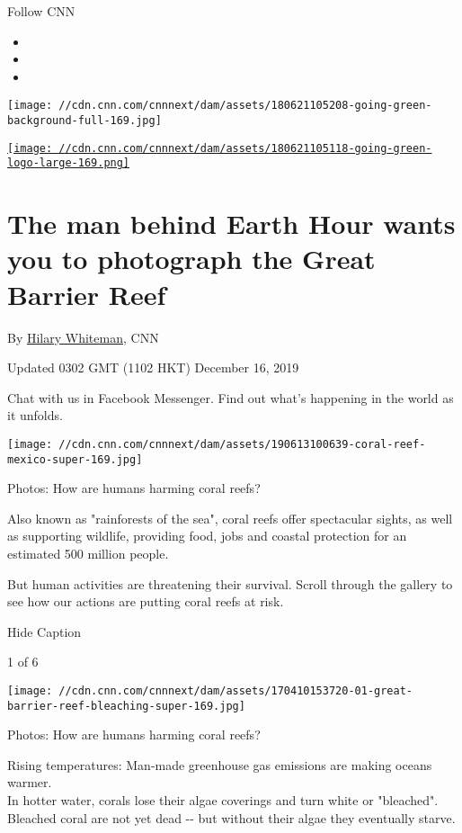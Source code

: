 Follow CNN

\begin{itemize}
\item
\item
\item
\end{itemize}

\texttt{[image: //cdn.cnn.com/cnnnext/dam/assets/180621105208-going-green-background-full-169.jpg]}

\href{/specials/world/goinggreen}{\texttt{[image: //cdn.cnn.com/cnnnext/dam/assets/180621105118-going-green-logo-large-169.png]}}

\hypertarget{the-man-behind-earth-hour-wants-you-to-photograph-the-great-barrier-reef}{%
\section{The man behind Earth Hour wants you to photograph the Great
Barrier
Reef}\label{the-man-behind-earth-hour-wants-you-to-photograph-the-great-barrier-reef}}

By \href{/profiles/hilary-whiteman}{Hilary Whiteman}, CNN

Updated 0302 GMT (1102 HKT) December 16, 2019

Chat with us in Facebook Messenger. Find out what's happening in the
world as it unfolds.

\texttt{[image: //cdn.cnn.com/cnnnext/dam/assets/190613100639-coral-reef-mexico-super-169.jpg]}

Photos: How are humans harming coral reefs?

Also known as "rainforests of the sea", coral reefs offer spectacular
sights, as well as supporting wildlife, providing food, jobs and coastal
protection for an estimated 500 million people.

But human activities are threatening their survival. Scroll through the
gallery to see how our actions are putting coral reefs at risk.

Hide Caption

1 of 6

\texttt{[image: //cdn.cnn.com/cnnnext/dam/assets/170410153720-01-great-barrier-reef-bleaching-super-169.jpg]}

Photos: How are humans harming coral reefs?

Rising temperatures: Man-made greenhouse gas emissions are making oceans
warmer.\\
In hotter water, corals lose their algae coverings and turn white or
"bleached". Bleached coral are not yet dead -\/- but without their algae
they eventually starve.

